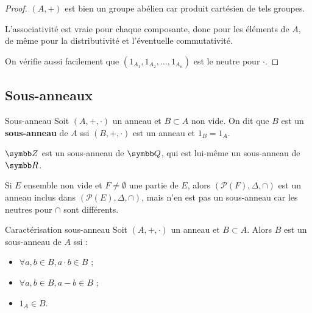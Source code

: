 \begin{proof}
    $(A, +)$ est bien un groupe abélien car produit cartésien de tels groupes.

    \svspace L'associativité est vraie pour chaque composante, donc pour les éléments de $A$, 
    de même pour la distributivité et l'éventuelle commutativité.

    \svspace On vérifie aussi facilement que 
    $(1_{A_1}, 1_{A_2}, \ldots, 1_{A_n})$ est le neutre pour $\cdot$.
\end{proof}


\subsection{Sous-anneaux}

\begin{definition}{Sous-anneau}{}
    Soit $(A, +, \cdot)$ un anneau et $B \subset A$ non vide. On dit que $B$ est un 
    \textbf{sous-anneau} de $A$ ssi $(B, +, \cdot)$ est un anneau et $1_B = 1_A$.
\end{definition}

\begin{exemple}
    $\Z$ est un sous-anneau de $\Q$, qui est lui-même un sous-anneau de $\R$.

    Si $E$ ensemble non vide et $F \neq \emptyset$ une partie de $E$, alors
    $(\mathscr{P}(F), \Delta, \cap)$ est un anneau inclus dans $(\mathscr{P}(E), \Delta, \cap)$,
    mais n'en est pas un sous-anneau car les neutres pour $\cap$ sont différents.  
\end{exemple}

\begin{proposition}{Caractérisation sous-anneau}{}
    Soit $(A, +, \cdot)$ un anneau et $B \subset A$. Alors 
    $B$ est un sous-anneau de $A$ ssi : 
    \begin{itemize}
        \item $\forall a, b \in B, a \cdot b \in B$ ;
        \item $\forall a, b \in B, a - b \in B$ ;
        \item $1_A \in B$.
    \end{itemize}
    
\end{proposition}


